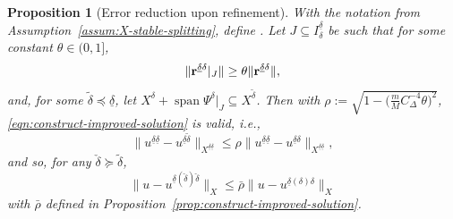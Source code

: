 \documentclass[11pt,a4paper,oneside,english]{amsart}
\numberwithin{equation}{section}
\numberwithin{theorem}{section}
\newtheorem{prop}[theorem]{Proposition}
\theoremstyle{definition}
\DeclareMathOperator{\spann}{span}
\newcommand{\udelta}{{\underline{\delta}}}
\begin{document}
\begin{prop}[Error reduction upon refinement]
  \label{prop:residual-apost}
  With the notation from Assumption~\ref{assum:X-stable-splitting}, define
  \framebox{${\bf r}^{\udelta \delta}:=(f^{\udelta \udelta}-S^{\udelta \udelta} u^{\udelta \delta})(\Psi^\delta)$}.
  Let $J \subseteq I_\delta^\udelta$ be such that for some constant $\theta \in (0,1]$,
  \[
    \|{\bf r}^{\udelta \delta}|_J\| \geq \theta \|{\bf r}^{\udelta \delta}\|,
  \]
  and, for some $\tilde{\delta} \preceq \udelta$, let $X^\delta +\spann \Psi^\delta|_J \subseteq X^{\tilde{\delta}}$.
  Then with $\rho:=\sqrt{1-\big(\frac{m}{M} C_\Delta^{-4} \theta\big)^2}$,
  \eqref{eqn:construct-improved-solution} is valid, i.e.,
  \[
    \|u^{\udelta \udelta}-u^{\udelta \tilde{\delta}}\|_{X^{\udelta \udelta}} \leq \rho \|u^{\udelta \udelta}-u^{\udelta \delta}\|_{X^{\udelta \udelta}},
  \]
  and so, for any $\check{\delta} \succeq \tilde{\delta}$,
  \[
    \|u-u^{\udelta(\check{\delta}) \check{\delta}}\|_X \leq \bar{\rho} \|u-u^{\udelta(\delta) \delta}\|_X
  \]
  with $\bar{\rho}$ defined in Proposition~\ref{prop:construct-improved-solution}.
\end{prop}
\end{document}
